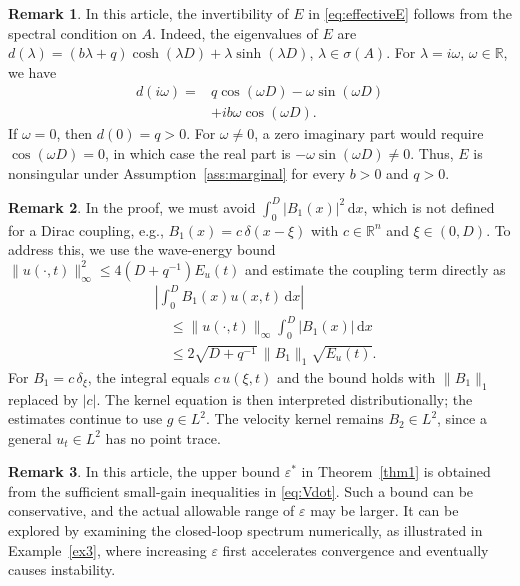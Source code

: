 \documentclass{IEEEtran}
\theoremstyle{definition}
\newtheorem{remark}{Remark}[section]
\begin{document}
\begin{remark}
\label{rem:E_nonsingular}
In this article, the invertibility of $E$ in
\eqref{eq:effectiveE} follows from the spectral condition on $A$.
Indeed, the eigenvalues of $E$ are
$d(\lambda)=(b\lambda+q)\cosh(\lambda D)
+\lambda\sinh(\lambda D)$, $\lambda\in\sigma(A)$.
For $\lambda=i\omega$, $\omega\in\mathbb R$, we have
\begin{equation}
\begin{aligned}
 d(i\omega)={}&q\cos(\omega D)-\omega\sin(\omega D)\\
 &+ib\omega\cos(\omega D).
\end{aligned}
\label{eq:E_spectrum}
\end{equation}
If $\omega=0$, then $d(0)=q>0$. For $\omega\ne0$, a zero
imaginary part would require $\cos(\omega D)=0$, in which
case the real part is $-\omega\sin(\omega D)\ne0$.
Thus, $E$ is nonsingular under Assumption~\ref{ass:marginal}
for every $b>0$ and $q>0$.
\end{remark}

\begin{remark}
\label{rem:dirac}
In the proof, we must avoid $\int_0^D|B_1(x)|^2\,\mathrm dx$,
which is not defined for a Dirac coupling, e.g.,
$B_1(x)=c\,\delta(x-\xi)$ with $c\in\mathbb R^n$ and
$\xi\in(0,D)$. To address this, we use the wave-energy bound
$\|u(\cdot,t)\|_\infty^2\leq4(D+q^{-1})E_u(t)$
and estimate the coupling term directly as
\begin{equation}
\begin{aligned}
 &\left|\int_0^D B_1(x)u(x,t)\,\mathrm dx\right|\\
 &\quad\leq\|u(\cdot,t)\|_\infty
       \int_0^D|B_1(x)|\,\mathrm dx\\
 &\quad\leq2\sqrt{D+q^{-1}}\,\|B_1\|_1\sqrt{E_u(t)}.
\end{aligned}
\label{eq:dirac_bound}
\end{equation}
For $B_1=c\,\delta_\xi$, the integral equals
$c\,u(\xi,t)$ and the bound holds with $\|B_1\|_1$
replaced by $|c|$. The kernel equation is then interpreted
distributionally; the estimates continue to use $g\in L^2$.
The velocity kernel remains $B_2\in L^2$, since a general
$u_t\in L^2$ has no point trace.
\end{remark}

\begin{remark}
\label{rem:epsilon_range}
In this article, the upper bound $\varepsilon^*$ in
Theorem~\ref{thm1} is obtained from the sufficient
small-gain inequalities in \eqref{eq:Vdot}. Such a bound can
be conservative, and the actual allowable range of
$\varepsilon$ may be larger. It can be explored by examining
the closed-loop spectrum numerically, as illustrated in
Example~\ref{ex3}, where increasing $\varepsilon$ first
accelerates convergence and eventually causes instability.
\end{remark}
\end{document}
